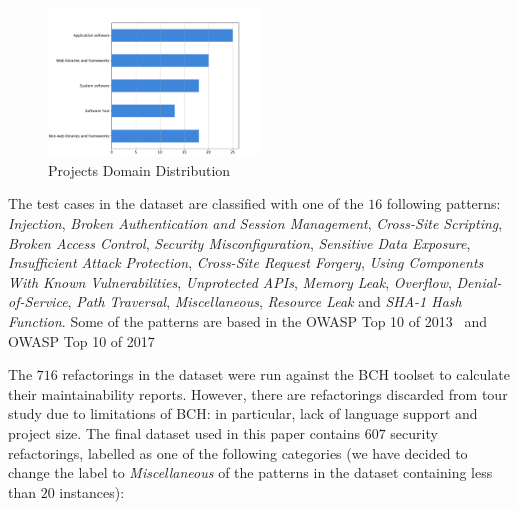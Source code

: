 \documentclass[10pt,conference]{IEEEtran}
\begin{document}
\begin{figure}[h]
 	\centering 	\includegraphics[width=0.5\textwidth]{figures/type_dist.pdf}
 	\caption{Projects Domain Distribution}
	\label{fig:domain}
\end{figure}

The test cases in the dataset are classified with one of the $16$ following
patterns: \textit{Injection}, \textit{Broken Authentication
and Session Management}, \textit{Cross-Site Scripting}, \textit{Broken Access
Control}, \textit{Security Misconfiguration}, \textit{Sensitive Data Exposure},
\textit{Insufficient Attack Protection}, \textit{Cross-Site Request Forgery},
\textit{Using Components With Known Vulnerabilities}, \textit{Unprotected APIs},
\textit{Memory Leak}, \textit{Overflow}, \textit{Denial-of-Service},
\textit{Path Traversal}, \textit{Miscellaneous}, \textit{Resource Leak} and
\textit{SHA-1 Hash Function}. Some of the patterns are based in the OWASP Top 10 of 2013~\cite{oswap:2013} and OWASP Top 10 of 2017~\cite{oswap:2017}

The $716$ refactorings in the dataset were run against the BCH toolset to
calculate their maintainability reports. However, there are refactorings
discarded from tour study due to limitations of BCH: in particular, lack of
language support and project size. The final dataset used in this paper contains
$607$ security refactorings, labelled as one of the following categories (we
have decided to change the label to \textit{Miscellaneous} of the patterns in
the dataset containing less than $20$ instances):
\end{document}
